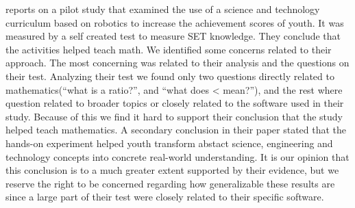 \bigskip\noindent
{} reports on a pilot study that examined the use of a science and technology curriculum based on robotics to increase the achievement scores of youth. It was measured by a self created test to measure SET knowledge. They conclude that the activities helped teach math. %
We identified some concerns related to their approach. The most concerning was related to their analysis and the questions on their test.
Analyzing their test we found only two questions directly related to mathematics("`what is a ratio?"', and "`what does < mean?"'), and the rest where question related to broader topics or closely related to the software used in their study. Because of this we find it hard to support their conclusion that the study helped teach mathematics. A secondary conclusion in their paper stated that the hands-on experiment helped youth transform abstact science, engineering and technology concepts into concrete real-world understanding. It is our opinion that this conclusion is to a much greater extent supported by their evidence, but we reserve the right to be concerned regarding how generalizable these results are since a large part of their test were closely related to their specific software.\cite{barker2007robotics}


